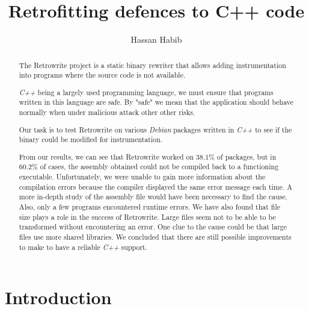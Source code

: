 \documentclass[a4paper,11pt,oneside]{report}
\title{Retrofitting defences to C++ code}
\author{Hassan Habib}
\newcommand{\sysname}{Retrowrite\xspace}
\begin{document}
\maketitle

\begin{abstract}
    The \sysname project is a static binary rewriter that allows adding
    instrumentation into programs where the source code is not available.

    \textit{C++} being a largely used programming language, we must ensure that programs
    written in this language are safe. By "safe" we mean that the application should
    behave normally when under malicious attack other other risks.

    Our task is to test Retrowrite on various \textit{Debian} packages written in \textit{C++} to
    see if the binary could be modified for instrumentation.

    From our results, we can see that \sysname worked on 38.1\% of packages,
    but in 60.2\% of cases, the assembly obtained could not be compiled back to
    a functioning executable. Unfortunately, we were unable to gain more
    information about the compilation errors because the compiler displayed the
    same error message each time. A more in-depth study of the assembly file
    would have been necessary to find the cause. Also, only a few programs
    encountered runtime errors. We have also found that file size plays a role
    in the success of \sysname. Large files seem not to be able to be
    transformed without encountering an error. One clue to the cause could be
    that large files use more shared libraries. We concluded that there are
    still possible improvements to make to have a reliable \textit{C++} support.

\end{abstract}


\maketoc

\chapter{Introduction}
\end{document}
